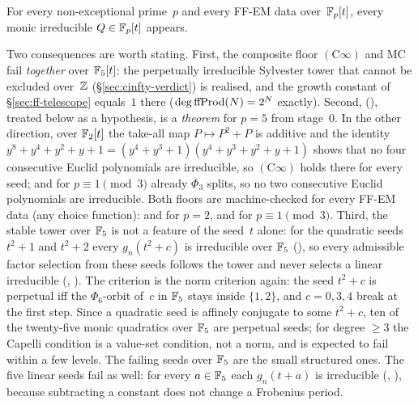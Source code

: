 \begin{conjecture}
\label{conj:ffmc-corrected}
For every non-exceptional prime~$p$ and every FF-EM data over~$\mathbb{F}_p[t]$,
every monic irreducible $Q \in \mathbb{F}_p[t]$ appears.
\end{conjecture}

Two consequences are worth stating.  First, the composite floor
$(\mathrm{C}\infty)$ and MC fail \emph{together} over $\mathbb{F}_5[t]$: the
perpetually irreducible Sylvester tower that cannot be excluded
over~$\mathbb{Z}$ (\S\ref{sec:cinfty-verdict}) is realised, and the growth
constant of \S\ref{sec:ff-telescope} equals~$1$ there
($\deg\mathrm{ffProd}(N) = 2^N$ exactly).  Second, 
(), treated below as a
hypothesis, is a \emph{theorem} for $p = 5$ from stage~$0$.  In the other
direction, over $\mathbb{F}_2[t]$ the take-all map $P \mapsto P^2+P$ is additive
and the identity $y^8+y^4+y^2+y+1 = (y^4+y^3+1)(y^4+y^3+y^2+y+1)$ shows
that no four consecutive Euclid polynomials are irreducible, so
$(\mathrm{C}\infty)$ holds there for every seed; and for $p \equiv 1
\pmod 3$ already $\Phi_3$ splits, so no two consecutive Euclid
polynomials are irreducible.  Both floors are machine-checked for every
FF-EM data (any choice function):
and
for $p = 2$,
and
for $p \equiv 1 \pmod 3$.  Third, the stable tower over $\mathbb{F}_5$ is not a
feature of the seed~$t$ alone: for the quadratic seeds $t^2+1$ and
$t^2+2$ every $g_n(t^2+c)$ is irreducible over $\mathbb{F}_5$
(), so
every admissible factor selection from these seeds follows the tower and
never selects a linear irreducible
(,
).
The criterion is the norm criterion again: the seed $t^2+c$ is perpetual
iff the $\Phi_6$-orbit of~$c$ in $\mathbb{F}_5$ stays inside $\{1,2\}$, and
$c = 0, 3, 4$ break at the first step.  Since a quadratic seed is affinely
conjugate to some $t^2+c$, ten of the twenty-five monic quadratics over
$\mathbb{F}_5$ are perpetual seeds; for degree $\geq 3$ the Capelli condition is
a value-set condition, not a norm, and is expected to fail within a few
levels.  The failing seeds over $\mathbb{F}_5$ are the small structured ones.
The five linear seeds fail as well: for every $a \in \mathbb{F}_5$ each
$g_n(t+a)$ is irreducible
(,
), because
subtracting a constant does not change a Frobenius period.

